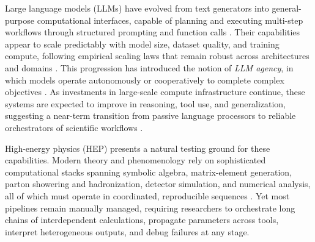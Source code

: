 \documentclass[11pt,oneside]{article}
\numberwithin{equation}{section}
\begin{document}
Large language models (LLMs) have evolved from text generators into general-purpose computational interfaces, capable of planning and executing multi-step workflows through structured prompting and function calls \cite{openai2024gpt4technicalreport,bubeck2023sparks,zhao2023survey,yin2023multimodal,minaee2025largelanguagemodelssurvey,grattafiori2024llama3herdmodels}. 
Their capabilities appear to scale predictably with model size, dataset quality, and training compute, following empirical scaling laws that remain robust across architectures and domains \cite{kaplan2020scaling,hoffmann2022training}. 
This progression has introduced the notion of \emph{LLM agency}, in which models operate autonomously or cooperatively to complete complex objectives \cite{guo2024largelanguagemodelbased,tran2025multiagentcollaborationmechanismssurvey,li2024survey_on_llm_based_multi_agent_systems}. 
As investments in large-scale compute infrastructure continue, these systems are expected to improve in reasoning, tool use, and generalization, suggesting a near-term transition from passive language processors to reliable orchestrators of scientific workflows \cite{wei2025aiscienceagenticscience}.

High-energy physics (HEP) presents a natural testing ground for these capabilities. 
Modern theory and phenomenology rely on sophisticated computational stacks spanning symbolic algebra, matrix-element generation, parton showering and hadronization, detector simulation, and numerical analysis, all of which must operate in coordinated, reproducible sequences \cite{Ask:2012sm}. 
Yet most pipelines remain manually managed, requiring researchers to orchestrate long chains of interdependent calculations, propagate parameters across tools, interpret heterogeneous outputs, and debug failures at any stage.
\end{document}
